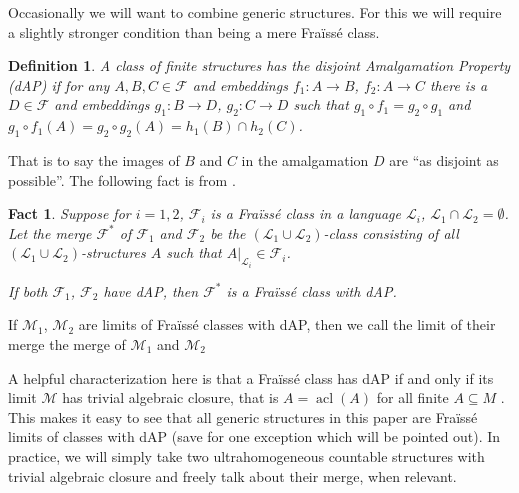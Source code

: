 \documentclass{amsart}
\newtheorem{definition}[theorem]{Definition}
\newtheorem{fact}[theorem]{Fact}
\def\lang{\mathcal{L}}
\newcommand{\model}{\mathcal{M}}
\DeclareMathOperator{\acl}{acl}
\begin{document}
Occasionally we will want to combine generic structures. For this we will require a slightly stronger condition than being a mere Fraïssé class.

\begin{definition}
    A class of finite structures has the \emph{disjoint Amalgamation Property} (dAP) if for any $A, B, C \in \mathcal{F}$ and embeddings $f_1: A \rightarrow B$, $f_2: A \rightarrow C$ there is a $D \in \mathcal{F}$ and embeddings $g_1: B \rightarrow D$, $g_2: C \rightarrow D$ such that $g_1 \circ f_1 = g_2 \circ g_1$ and $g_1\circ f_1 (A) = g_2 \circ g_2(A) = h_1(B) \cap h_2 (C)$. 
\end{definition}

That is to say the images of $B$ and $C$ in the amalgamation $D$ are ``as disjoint as possible''. The following fact is from \cite[\S 3.3]{Cameron_1990}.

\begin{fact}
    Suppose for $i = 1, 2$, $\mathcal{F}_i$ is a Fraïssé class in a language $\lang_i$, $\lang_1 \cap \lang_2 = \emptyset$. Let the \emph{merge} $\mathcal{F}^*$ of $\mathcal{F}_1$ and $\mathcal{F}_2$ be the $(\lang_1 \cup \lang_2)$-class consisting of all $(\lang_1\cup \lang_2)$-structures $A$ such that $A|_{\lang_i} \in \mathcal{F}_i$.

    If both $\mathcal{F}_1$, $\mathcal{F}_2$ have dAP, then $\mathcal{F}^*$ is a Fraïssé class with dAP.
\end{fact}

If $\mathcal{M}_1$, $\mathcal{M}_2$ are limits of Fraïssé classes with dAP, then we call the limit of their merge the merge of $\mathcal{M}_1$ and $\mathcal{M}_2$

A helpful characterization here is that a Fraïssé class has dAP if and only if its limit $\model$ has trivial algebraic closure, that is $A = \acl(A)$ for all finite $A \subseteq M$ \cite{Cameron_1990}. This makes it easy to see that all generic structures in this paper are Fraïssé limits of classes with dAP (save for one exception which will be pointed out). In practice, we will simply take two ultrahomogeneous countable structures with trivial algebraic closure and freely talk about their merge, when relevant.
\end{document}
